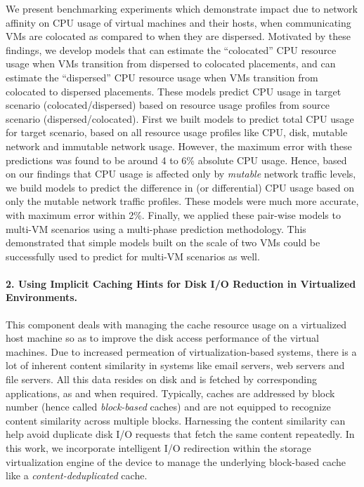 We present benchmarking experiments
which demonstrate impact due to network affinity
on CPU usage of virtual machines and their hosts, when communicating
VMs are colocated as compared to
when they are dispersed. Motivated by these findings, we develop models
that can estimate the ``colocated'' CPU resource usage when VMs transition
from dispersed to colocated placements, and can estimate the ``dispersed''
CPU resource usage when VMs transition from colocated to dispersed
placements. These models predict CPU usage in target 
scenario (colocated/dispersed) based on resource usage profiles 
from source scenario (dispersed/colocated).
First we built models to predict total CPU usage for target scenario,
based on all resource usage profiles like CPU, disk, mutable network
and immutable network usage. However, the maximum error with these 
predictions was found to be around 4 to 6\% absolute CPU usage. 
Hence, based on our findings that CPU usage is affected only by
\textit{mutable} network traffic levels, we build models to 
predict the difference in (or differential) CPU usage based on only
the mutable network traffic profiles. These models were much more
accurate, with maximum error within 2\%. Finally, we applied these
pair-wise models to multi-VM scenarios using a multi-phase
prediction methodology. This demonstrated that simple models
built on the scale of two VMs could be successfully used to
predict for multi-VM scenarios as well.

\paragraph{2. Using Implicit Caching Hints for {D}isk I/O {R}eduction in Virtualized Environments.}
This component deals with managing the cache resource
usage on a virtualized host machine so as to improve the disk access performance 
of the virtual machines.
Due to increased permeation of virtualization-based systems, there is a lot of 
inherent content similarity in systems like email servers, web servers 
and file servers. All this data resides on disk and is fetched by corresponding
applications, as and when required. 
Typically, caches are addressed by block number (hence called 
\textit{block-based} caches) and are not
equipped to recognize content similarity across multiple blocks.
Harnessing the content similarity can help 
avoid duplicate disk I/O requests that fetch the same content repeatedly.
In this work, we incorporate intelligent I/O redirection within the 
storage virtualization engine of the device to manage the underlying 
block-based cache like a \textit{content-deduplicated} cache.

